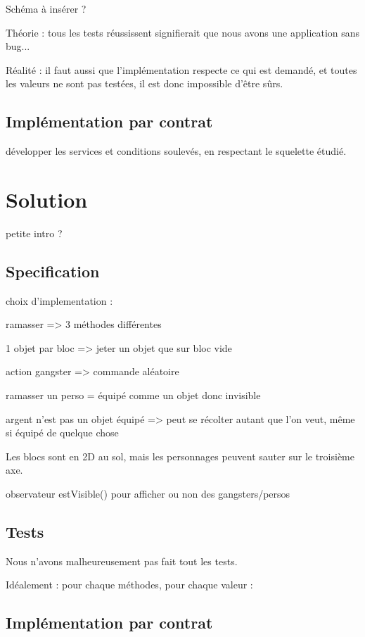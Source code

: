 \documentclass[a4paper, 11pt, notitlepage]{article}
\begin{document}
Schéma à insérer ?

Théorie : tous les tests réussissent signifierait que nous avons une application sans bug...

Réalité : il faut aussi que l’implémentation respecte ce qui est
demandé, et toutes les valeurs ne sont pas testées, il est donc
impossible d'être sûrs.


\subsection{Implémentation par contrat}
développer les services et conditions soulevés, en respectant le
squelette étudié.








\section{Solution}
petite intro ?

\subsection{Specification}
choix d'implementation :

 ramasser => 3 méthodes différentes

 1 objet par bloc => jeter un objet que sur bloc vide

 action gangster => commande aléatoire

 ramasser un perso = équipé comme un objet donc invisible

 argent n’est pas un objet équipé  => peut se récolter autant que l’on
          veut, même si équipé de quelque chose

 Les blocs sont en 2D au sol, mais les personnages peuvent sauter sur
   le troisième axe.

 observateur estVisible() pour afficher ou non des gangsters/persos


\subsection{Tests}
Nous n'avons malheureusement pas fait tout les tests.

Idéalement : pour chaque méthodes, pour chaque valeur : 

\subsection{Implémentation par contrat}
\end{document}
